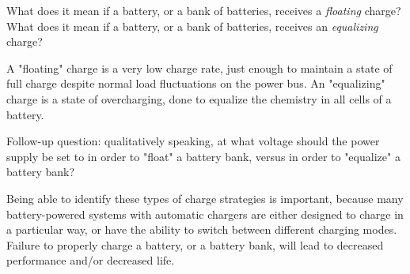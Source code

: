 

What does it mean if a battery, or a bank of batteries, receives a {\it floating} charge?  What does it mean if a battery, or a bank of batteries, receives an {\it equalizing} charge?







A "floating" charge is a very low charge rate, just enough to maintain a state of full charge despite normal load fluctuations on the power bus.  An "equalizing" charge is a state of overcharging, done to equalize the chemistry in all cells of a battery.

\vskip 10pt

Follow-up question: qualitatively speaking, at what voltage should the power supply be set to in order to "float" a battery bank, versus in order to "equalize" a battery bank?







Being able to identify these types of charge strategies is important, because many battery-powered systems with automatic chargers are either designed to charge in a particular way, or have the ability to switch between different charging modes.  Failure to properly charge a battery, or a battery bank, will lead to decreased performance and/or decreased life.





